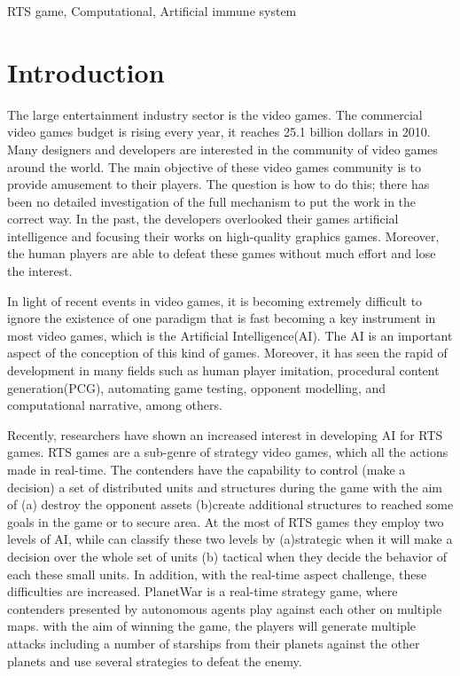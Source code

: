 \documentclass[conference]{IEEEtran}
\begin{document}
\begin{IEEEkeywords}
RTS game, Computational, Artificial immune system
\end{IEEEkeywords}

\section{Introduction}
The large entertainment industry sector is the video games. The commercial video games budget is rising every year, it reaches 25.1 billion dollars in 2010\cite{doc2}. Many designers and developers are interested in the community of video games around the world. The main objective of these video games community is to provide amusement to their players. The question is how to do this; there has been no detailed investigation of the full mechanism to put the work in the correct way\cite{doc5}.
In the past, the developers overlooked their games artificial intelligence and focusing their works on high-quality graphics games. Moreover, the human players are able to defeat these games without much effort and lose the interest\cite{doc5}.  

In light of recent events in video games, it is becoming extremely difficult to ignore the existence of one paradigm that is fast becoming a key instrument in most video games, which is the Artificial Intelligence(AI). The AI is an important aspect of the conception of this kind of games. Moreover, it has seen the rapid of development in many fields such as human player imitation, procedural content generation(PCG), automating game testing, opponent modelling, and computational narrative, among others\cite{doc5}.

Recently, researchers have shown an increased interest in developing AI for RTS games. RTS games are a sub-genre of strategy video games, which all the actions made in real-time. The contenders have the capability to control (make a decision) a set of distributed units and structures during the game with the aim of (a) destroy the opponent assets (b)create additional structures to reached some goals in the game or to secure area\cite{doc5,doc1,doc2,doc3,doc4}. At the most of RTS games they employ two levels of AI\cite{doc1}, while can classify these two levels by (a)strategic when it will make a decision over the whole set of units (b) tactical when they decide the behavior of each these small units. In addition, with the real-time aspect challenge, these difficulties are increased. PlanetWar is a real-time strategy game, where contenders presented by autonomous agents play against each other on multiple maps. with the aim of winning the game, the players will generate multiple attacks including a number of starships from their planets against the other planets and use several strategies to defeat the enemy.
\end{document}
